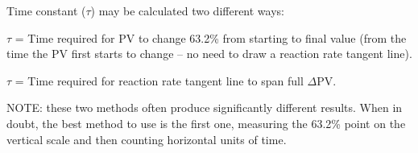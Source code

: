 \documentclass[12pt,a4paper]{article}
\begin{document}
\vskip 10pt


Time constant ($\tau$) may be calculated two different ways:
 
\vskip 10pt

$\tau$ = Time required for PV to change 63.2\% from starting to final value (from the time the PV first starts to change -- no need to draw a reaction rate tangent line).
 
\vskip 10pt

$\tau$ = Time required for reaction rate tangent line to span full $\Delta$PV.

\vskip 10pt

NOTE: these two methods often produce significantly different results.  When in doubt, the best method to use is the first one, measuring the 63.2\% point on the vertical scale and then counting horizontal units of time.


\vfil \eject 
\end{document}
